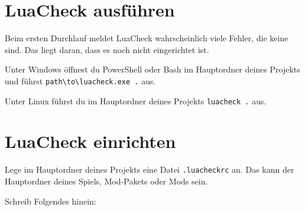 \section{LuaCheck ausführen}\label{luacheck-ausfuxfchren}

Beim ersten Durchlauf meldet LuaCheck wahrscheinlich viele Fehler, die
keine sind. Das liegt daran, dass es noch nicht eingerichtet ist.

Unter Windows öffnest du PowerShell oder Bash im Hauptordner deines
Projekts und führst
\texttt{path\textbackslash{}to\textbackslash{}luacheck.\allowbreak{}exe .\allowbreak{}}
aus.

Unter Linux führst du im Hauptordner deines Projekts
\texttt{luacheck .\allowbreak{}} aus.

\section{LuaCheck einrichten}\label{luacheck-einrichten}

Lege im Hauptordner deines Projekts eine Datei
\texttt{.\allowbreak{}luacheckrc} an. Das kann der Hauptordner deines
Spiels, Mod-Pakets oder Mods sein.

Schreib Folgendes hinein:

\begin{Shaded}
\begin{Highlighting}[]
 \OperatorTok{=} 
 \OperatorTok{=} 

 \OperatorTok{=} \OperatorTok{\{}
    \OperatorTok{,}
\OperatorTok{\}}

 \OperatorTok{=} \OperatorTok{\{}
     \OperatorTok{=} \OperatorTok{\{}  \OperatorTok{=} \OperatorTok{\{}  \OperatorTok{\}} \OperatorTok{\},}
     \OperatorTok{=} \OperatorTok{\{}  \OperatorTok{=} \OperatorTok{\{} \OperatorTok{,}  \OperatorTok{\}} \OperatorTok{\},}

    \OperatorTok{,}
    \OperatorTok{,}
    \OperatorTok{,}
    \OperatorTok{,}
    \OperatorTok{,}
    \OperatorTok{,}

    \OperatorTok{,}
    \OperatorTok{,}
    \OperatorTok{,}
\OperatorTok{\}}
\end{Highlighting}
\end{Shaded}

